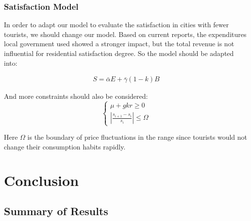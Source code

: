 \documentclass[UTF8]{mcmthesis}
\begin{document}
            \subsubsection{Satisfaction Model}
            In order to adapt our model to evaluate the satisfaction in cities with fewer tourists, we should change our model. Based on current reports, the expenditures local government used showed a stronger impact, but the total revenue is not influential for residential satisfaction degree. So the model should be adapted into:
            
           \begin{equation}
           	\begin{aligned}
           		S = \bar{\alpha}E+\bar{\gamma}(1-k)B
           	\end{aligned}
           \end{equation}
            
            And more constraints should also be considered:
            \begin{equation}
            	\begin{cases}
            		\mu + gkr \ge 0 \\
            		|\frac{s_{i+1}-s_i}{s_i}|\le \Omega
            	\end{cases}
            \end{equation}
            
            Here $\Omega$ is the boundary of price fluctuations in the range since tourists would not change their consumption habits rapidly.
            \section{Conclusion}
            \subsection{Summary of Results}
\end{document}
